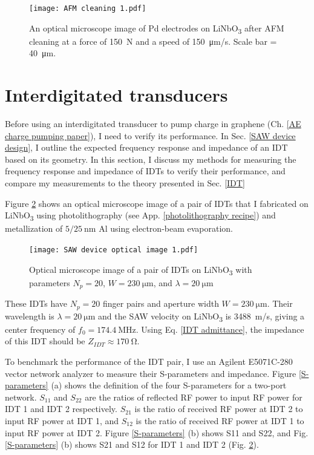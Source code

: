 \documentclass[double,12pt,1in]{beavtex}
\begin{document}
\begin{figure}
    \texttt{[image: AFM cleaning 1.pdf]}
    \caption{An optical microscope image of Pd electrodes on LiNbO\textsubscript{3} after AFM cleaning at a force of \SI{150}{N} and a speed of \SI{150}{\micro\meter/\second}. Scale bar = \SI{40}{\micro\meter}.}
    \label{AFM cleaning points}
\end{figure}


\section{Interdigitated transducers} \label{IDT methods}

Before using an interdigitated transducer to pump charge in graphene (Ch. \ref{AE charge pumping paper}), I need to verify its performance. In Sec. \ref{SAW device design}, I outline the expected frequency response and impedance of an IDT based on its geometry. In this section, I discuss my methods for measuring the frequency response and impedance of IDTs to verify their performance, and compare my measurements to the theory presented in Sec. \ref{IDT} 

Figure \ref{SAW device optical image with measurements} shows an optical microscope image of a pair of IDTs that I fabricated on LiNbO\textsubscript{3} using photolithography (see App. \ref{photolithography recipe}) and metallization of $5/\SI{25}{\nano\meter}$ Al using electron-beam evaporation.

\begin{figure}
    \texttt{[image: SAW device optical image 1.pdf]}
    \caption{Optical microscope image of a pair of IDTs on LiNbO\textsubscript{3} with parameters $N_p = 20$, $W = \SI{230}{\micro\meter}$, and $\lambda = \SI{20}{\micro\meter}$ }
    \label{SAW device optical image with measurements}
\end{figure}

These IDTs have $N_p = 20$ finger pairs and aperture width $W = \SI{230}{\micro\meter}$. Their wavelength is $\lambda = \SI{20}{\micro\meter}$ and the SAW velocity on LiNbO\textsubscript{3} is \SI{3488}{\meter/\second}, giving a center frequency of $f_0 = \SI{174.4}{\mega\hertz}$. Using Eq. \ref{IDT admittance}, the impedance of this IDT should be $Z_{IDT} \approx \SI{170}{\ohm}$. 

To benchmark the performance of the IDT pair, I use an Agilent E5071C-280 vector network analyzer to measure their S-parameters and impedance. Figure \ref{S-parameters} (a) shows the definition of the four S-parameters for a two-port network. $S_{11}$ and $S_{22}$ are the ratios of reflected RF power to input RF power for IDT 1 and IDT 2 respectively. $S_{21}$ is the ratio of received RF power at IDT 2 to input RF power at IDT 1, and $S_12$ is the ratio of received RF power at IDT 1 to input RF power at IDT 2. Figure \ref{S-parameters} (b) shows S11 and S22, and Fig. \ref{S-parameters} (b) shows S21 and S12 for IDT 1 and IDT 2 (Fig. \ref{SAW device optical image with measurements}).
\end{document}

